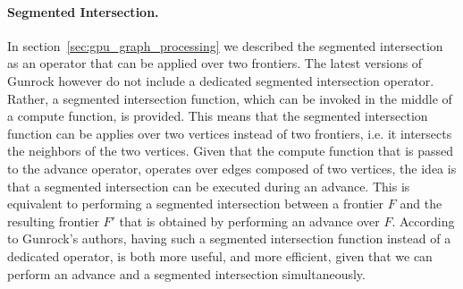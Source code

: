
\paragraph{\textbf{Segmented Intersection}.}
In section~\ref{sec:gpu_graph_processing} we described the segmented intersection as an operator that can be applied over two frontiers. The latest versions of Gunrock however do not include a dedicated segmented intersection operator. Rather, a segmented intersection function, which can be invoked in the middle of a compute function, is provided. This means that  the segmented intersection function can be applies over two vertices instead of two frontiers, i.e. it intersects the neighbors of the two vertices. Given that the compute function that is passed to the advance operator, operates over edges composed of two vertices, the idea is that  a segmented intersection can be executed during an advance. 
This is equivalent to performing a segmented intersection between a frontier $F$ and the resulting frontier $F'$ that is obtained by performing an advance over $F$. According to Gunrock's authors, having such a segmented intersection function instead of a dedicated operator, is both more useful, and more efficient, given that we can perform an advance and a segmented intersection simultaneously. 

